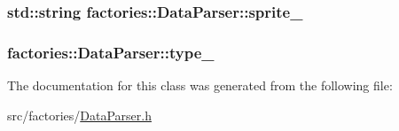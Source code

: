 \hypertarget{classfactories_1_1DataParser_a5cca04bb7449e4801c349c7432491d10}{
\subsubsection[{sprite\-\_\-}]{\setlength{\rightskip}{0pt plus 5cm}std\-::string {\bf factories\-::\-Data\-Parser\-::sprite\-\_\-}}}\label{d0/df8/classfactories_1_1DataParser_a5cca04bb7449e4801c349c7432491d10}
\hypertarget{classfactories_1_1DataParser_a689111b4c6ee7488a62c3fb1ff89cd5d}{
\subsubsection[{type\-\_\-}]{ {\bf factories\-::\-Data\-Parser\-::type\-\_\-}}}\label{d0/df8/classfactories_1_1DataParser_a689111b4c6ee7488a62c3fb1ff89cd5d}


\-The documentation for this class was generated from the following file\-:\begin{DoxyCompactItemize}
\item 
src/factories/\hyperlink{DataParser_8h}{\-Data\-Parser.\-h}\end{DoxyCompactItemize}
